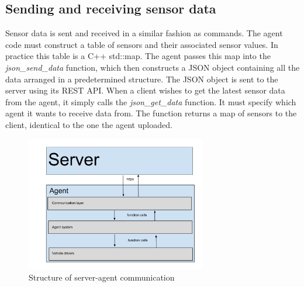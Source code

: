 \subsection{Sending and receiving sensor data}
Sensor data is sent and received in a similar fashion as commands.
The agent code must construct a table of sensors and their associated sensor values. 
In practice this table is a C++ std::map. 
The agent passes this map into the \textit{json\_send\_data} function, which then constructs a JSON object containing all the data arranged in a predetermined structure. 
The JSON object is sent to the server using its REST API.
When a client wishes to get the latest sensor data from the agent, it simply calls the \textit{json\_get\_data} function.
It must specify which agent it wants to receive data from.
The function returns a map of sensors to the client, identical to the one the agent uploaded.

\begin{figure}[H]
    \centering
    \includegraphics[width=0.7\textwidth]{graphics/Agent_server_communication.png} 
    \caption{Structure of server-agent communication}
    \label{fig:agent_server_communication}
\end{figure}

